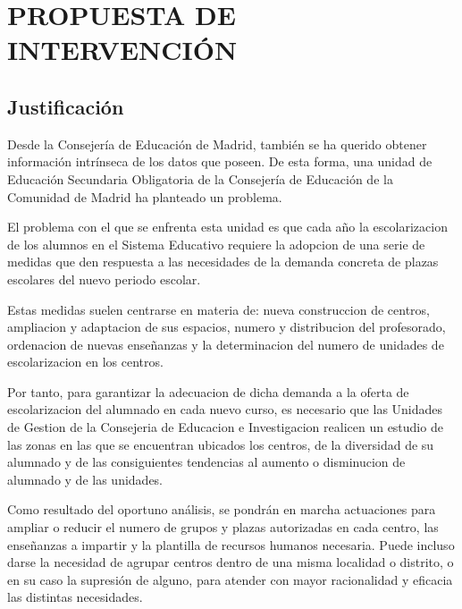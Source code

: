 \section{PROPUESTA DE INTERVENCIÓN}
\subsection{Justificación}
Desde la Consejería de Educación de Madrid, también se ha querido obtener información intrínseca de los datos que poseen. De esta forma, una unidad de Educación Secundaria Obligatoria de la Consejería de Educación de la Comunidad de Madrid ha planteado un problema.

El problema con el que se enfrenta esta unidad es que cada año la escolarizacion de los alumnos en el Sistema Educativo requiere la adopcion de una serie de medidas que den respuesta a las necesidades de la demanda concreta de plazas escolares del nuevo periodo escolar.

Estas medidas suelen centrarse en materia de: nueva construccion de centros, ampliacion y adaptacion de sus espacios, numero y distribucion del profesorado, ordenacion de nuevas enseñanzas y la determinacion del numero de unidades de escolarizacion en los centros.

Por tanto, para garantizar la adecuacion de dicha demanda a la oferta de escolarizacion del alumnado en cada nuevo curso, es necesario que las Unidades de Gestion de la Consejeria de Educacion e Investigacion realicen un estudio de las zonas en las que se encuentran ubicados los centros, de la diversidad de su alumnado y de las consiguientes tendencias al aumento o disminucion de alumnado y de las unidades.

Como resultado del oportuno análisis, se pondrán en marcha actuaciones para ampliar o reducir el numero de grupos y plazas autorizadas en cada centro, las enseñanzas a impartir y la plantilla de recursos humanos necesaria. Puede incluso darse la necesidad de agrupar centros dentro de una misma localidad o distrito, o en su caso la supresión de alguno, para atender con mayor racionalidad y eficacia las distintas necesidades.

